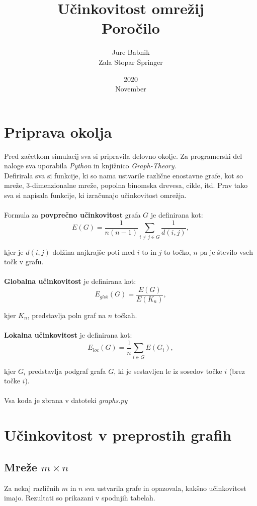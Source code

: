 \documentclass[a4paper, 16pt]{article}
\title{%
    Učinkovitost omrežij \\ 
    \large Poročilo}
\date{2020\\ November}
\author{Jure Babnik \\  Zala Stopar Špringer}
\begin{document}
\maketitle
{}


\newpage

\tableofcontents

\newpage
{}

\section{Priprava okolja}

Pred začetkom simulacij sva si pripravila delovno okolje. Za programerski del naloge sva uporabila \emph{Python}
in knjižnico \emph{Graph-Theory}.\\ 
Defirirala sva si funkcije, ki so nama ustvarile različne enostavne grafe, kot so mreže, 3-dimenzionalne mreže, 
popolna binomska drevesa, cikle, itd.
Prav tako sva si napisala funkcije, ki izračunajo učinkovitost omrežja. \\
\\
Formula za \textbf{povprečno učinkovitost} grafa $G$ je definirana kot:
$$ E(G) = \frac{1}{n(n-1)} \sum_{i\neq j \in G} \frac{1}{d(i,j)},$$

kjer je $d(i,j)$ dolžina najkrajše poti med $i$-to in $j$-to točko, $n$ pa je število vseh točk v grafu.\\
\\
\textbf{Globalna učinkovitost} je definirana kot:
$$ E_{glob}(G) = \frac{E(G)}{E(K_n)}, $$

kjer $K_n$, predstavlja poln graf na $n$ točkah.\\
\\
\textbf{Lokalna učinkovitost} je definirana kot:
$$ E_{loc}(G) = \frac{1}{n} \sum_{i \in G} E(G_i), $$

kjer $G_i$ predstavlja podgraf grafa $G$, ki je sestavljen le iz sosedov točke $i$ (brez točke $i$). \\
\\
Vsa koda je zbrana v datoteki \emph{graphs.py}


\section{Učinkovitost v preprostih grafih}



    \subsection{Mreže $m \times n$}
    Za nekaj različnih $m$ in $n$ sva ustvarila grafe in opazovala, kakšno učinkovitost imajo.
    Rezultati so prikazani v spodnjih tabelah.
\end{document}
